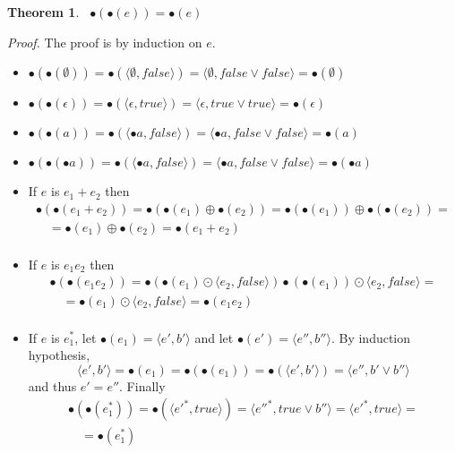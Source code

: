 \documentclass[preprint]{sigplanconf}
\newcommand{\true}{\mathit{true}}
\newcommand{\false}{\mathit{false}}
\newcounter{item}
\newtheorem{theorem}[item]{Theorem}
\newenvironment{proof}{\begin{trivlist}\item[]{\em Proof.}}{\end{trivlist}}
\begin{document}
\begin{theorem}\label{bullid}
 ~\quad$\bullet(\bullet(e)) = \bullet(e)$
\end{theorem}
\begin{proof}
The proof is by induction on $e$.
\begin{itemize}
\item $\bullet(\bullet(\emptyset)) = \bullet (\langle \emptyset,\false \rangle)
 = \langle \emptyset,\false \vee \false \rangle = \bullet (\emptyset)$
\item $\bullet(\bullet(\epsilon)) = \bullet(\langle \epsilon,\true \rangle)
= \langle \epsilon, \true \vee \true \rangle = \bullet(\epsilon)$
\item $\bullet(\bullet(a)) = \bullet(\langle \bullet a, \false \rangle) =
\langle \bullet a, \false \vee \false \rangle = \bullet(a)$
\item $\bullet(\bullet(\bullet a)) = \bullet(\langle \bullet a, \false \rangle) =
\langle \bullet a, \false \vee \false \rangle = \bullet(\bullet a)$
\item If $e$ is $e_1 + e_2$ then
$$\begin{array}{l}
\bullet(\bullet(e_1+e_2)) =
\bullet(\bullet(e_1) \oplus \bullet(e_2))
= \bullet(\bullet(e_1)) \oplus \bullet(\bullet(e_2)) =\\
\quad = \bullet(e_1) \oplus \bullet(e_2)
= \bullet(e_1+e_2)\\
\end{array}$$
\item If $e$ is $e_1 e_2$ then
$$\begin{array}{l}
\bullet(\bullet(e_1e_2)) =
\bullet(\bullet(e_1) \odot \langle e_2, \false \rangle)
\bullet(\bullet(e_1)) \odot \langle e_2, \false \rangle =\\
\quad = \bullet(e_1) \odot \langle e_2, \false \rangle
= \bullet(e_1e_2)\\
\end{array}$$
\item If $e$ is $e_1^*$, let $\bullet (e_1) = \langle e',b' \rangle$ and
let $\bullet (e') = \langle e'',b'' \rangle$.
By induction hypothesis,
$$\langle e',b' \rangle = \bullet (e_1) = \bullet (\bullet (e_1)) = \bullet (\langle e',b' \rangle) = \langle e'',b' \vee b'' \rangle$$
and thus $e' = e''$. Finally
$$\begin{array}{l}
\bullet(\bullet(e_1^*))
= \bullet (\langle e'^*,\true \rangle)
= {\langle e''}^*, \true \vee b'' \rangle
= \langle e'^*,\true \rangle= \\
\quad = \bullet(e_1^*)
\end{array}$$
\end{itemize}
\end{proof}
\end{document}
